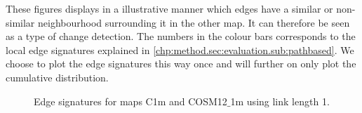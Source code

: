 These figures displays in a illustrative manner which edges have a similar or non-similar neighbourhood surrounding it in the other map. It can therefore be seen as a type of change detection. The numbers in the colour bars corresponds to the local edge signatures explained in \ref{chp:method.sec:evaluation.sub:pathbased}.
We choose to plot the edge signatures this way once and will further on only plot the cumulative distribution.   



\begin{figure}[H]%
 \centering
 
 

 \caption{Edge signatures for maps C1m and COSM12$\_$1m using link length 1.}%
 \label{fig:results/c1mosmpathl1}
\end{figure}

\enlargethispage{5\baselineskip}

